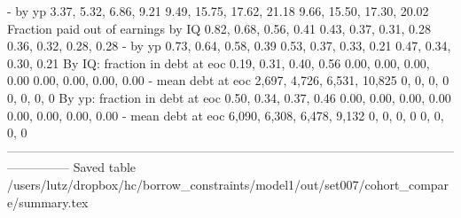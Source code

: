                                - by yp       3.37, 5.32, 6.86, 9.21   9.49, 15.75, 17.62, 21.18   9.66, 15.50, 17.30, 20.02
   Fraction paid out of earnings by IQ       0.82, 0.68, 0.56, 0.41      0.43, 0.37, 0.31, 0.28      0.36, 0.32, 0.28, 0.28
                               - by yp       0.73, 0.64, 0.58, 0.39      0.53, 0.37, 0.33, 0.21      0.47, 0.34, 0.30, 0.21
        By IQ: fraction in debt at eoc       0.19, 0.31, 0.40, 0.56      0.00, 0.00, 0.00, 0.00      0.00, 0.00, 0.00, 0.00
                    - mean debt at eoc  2,697, 4,726, 6,531, 10,825                  0, 0, 0, 0                  0, 0, 0, 0
        By yp: fraction in debt at eoc       0.50, 0.34, 0.37, 0.46      0.00, 0.00, 0.00, 0.00      0.00, 0.00, 0.00, 0.00
                    - mean debt at eoc   6,090, 6,308, 6,478, 9,132                  0, 0, 0, 0                  0, 0, 0, 0
---------------------------------------------------------------------------------------------------------------------------
Saved table  /users/lutz/dropbox/hc/borrow_constraints/model1/out/set007/cohort_compare/summary.tex 
